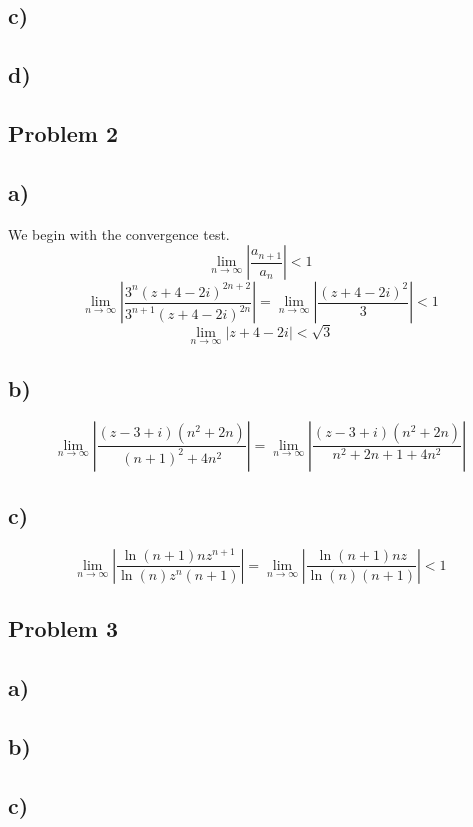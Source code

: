 \documentclass{article}
\begin{document}
\subsection*{c)}

\subsection*{d)}




\subsection*{Problem 2}
\subsection*{a)}
We begin with the convergence test. 
\[
\lim_{n \to ∞}\left|\frac{a_{n+1}}{a_n}\right| < 1
\]
\[
\lim_{n \to ∞} \left|\frac{3^{n}(z+4-2i)^{2n + 2}}{3^{n+1}(z+4-2i)^{2n}}\right| = \lim_{n \to ∞} \left|\frac{(z+4-2i)^2}{3}\right| < 1
\]
\[
\lim_{n \to ∞} \left|z + 4 - 2i\right| < \sqrt{3}
\]

\subsection*{b)}
\[
\lim_{n \to ∞} \left|\frac{\left(z-3+i\right)(n^2 + 2n)}{(n+1)^2 + 4n^2}\right| = \lim_{n \to ∞} \left|\frac{(z-3+i)(n^2 + 2n)}{n^2 + 2n + 1 + 4n^2}\right|
\]

\subsection*{c)}
\[
\lim_{n \to ∞} \left|\frac{\ln (n+1)nz^{n+1}}{\ln (n)z^{n}(n+1)}\right| = \lim_{n \to ∞} \left|\frac{\ln (n+1)n z}{\ln (n)(n+1)}\right| < 1
\]




\subsection*{Problem 3}
\subsection*{a)}

\subsection*{b)}

\subsection*{c)}
\end{document}
